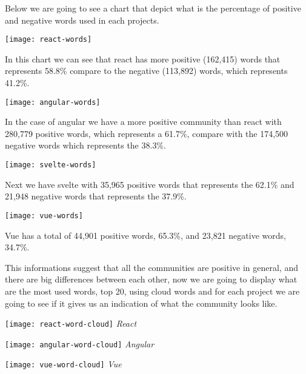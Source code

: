 Below we are going to see a chart that depict what is the percentage of positive and negative words used in each projects.

\begin{center}
    \texttt{[image: react-words]}    
\end{center}

In this chart we can see that react has more positive (162,415) words that represents 58.8\% compare to the negative (113,892) words, which represents 41.2\%.

\begin{center}
    \texttt{[image: angular-words]}    
\end{center}

In the case of angular we have a more positive community than react with 280,779 positive words, which represents a 61.7\%, compare with the 174,500 negative words which represents the 38.3\%.

\begin{center}
    \texttt{[image: svelte-words]}    
\end{center}

Next we have svelte with 35,965 positive words that represents the 62.1\% and 21,948 negative words that represents the 37.9\%.

\begin{center}
    \texttt{[image: vue-words]}    
\end{center}

Vue has a total of 44,901 positive words, 65.3\%, and 23,821 negative words, 34.7\%.

This informations suggest that all the communities are positive in general, and there are big differences between each other, now we are going to display what are the most used words, top 20, using cloud words and for each project we are going to see if it gives us an indication of what the community looks like.

\begin{center}
    \texttt{[image: react-word-cloud]}    
    \textit{React}
\end{center}


\begin{center}
    \texttt{[image: angular-word-cloud]}    
    \textit{Angular}
\end{center}


\begin{center}
    \texttt{[image: vue-word-cloud]}    
    \textit{Vue}
\end{center}

